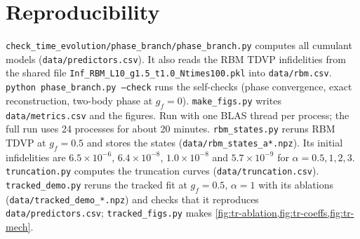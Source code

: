 \documentclass[11pt,a4paper]{article}
\begin{document}
\section{Reproducibility}\label{app:repro}
\texttt{check\_time\_evolution/phase\_branch/phase\_branch.py} computes all cumulant models (\texttt{data/predictors.csv}). It also reads the RBM TDVP infidelities from the shared file \texttt{Inf\_RBM\_L10\_g1.5\_t1.0\_Ntimes100.pkl} into \texttt{data/rbm.csv}. \texttt{python phase\_branch.py --check} runs the self-checks (phase convergence, exact reconstruction, two-body phase at $g_f=0$). \texttt{make\_figs.py} writes \texttt{data/metrics.csv} and the figures. Run with one BLAS thread per process; the full run uses 24 processes for about 20 minutes. \texttt{rbm\_states.py} reruns RBM TDVP at $g_f=0.5$ and stores the states (\texttt{data/rbm\_states\_a*.npz}). Its initial infidelities are $6.5\times10^{-6}$, $6.4\times10^{-8}$, $1.0\times10^{-8}$ and $5.7\times10^{-9}$ for $\alpha=0.5,1,2,3$. \texttt{truncation.py} computes the truncation curves (\texttt{data/truncation.csv}). \texttt{tracked\_demo.py} reruns the tracked fit at $g_f=0.5$, $\alpha=1$ with its ablations (\texttt{data/tracked\_demo\_*.npz}) and checks that it reproduces \texttt{data/predictors.csv}; \texttt{tracked\_figs.py} makes \cref{fig:tr-ablation,fig:tr-coeffs,fig:tr-mech}.



\end{document}
